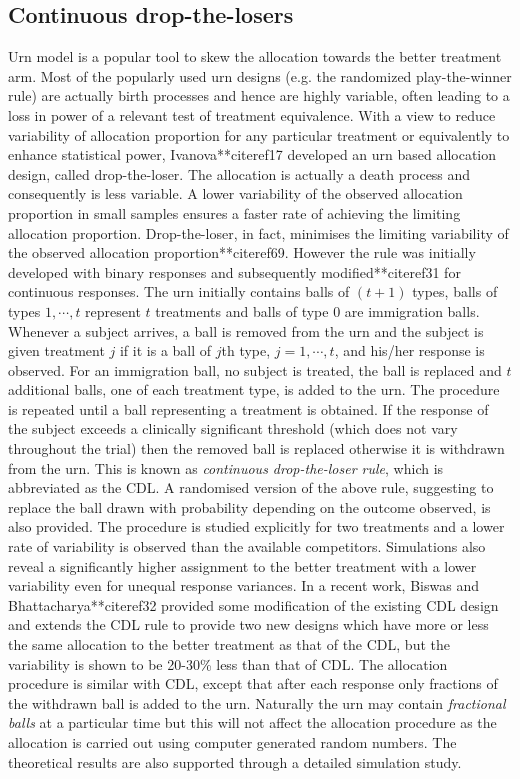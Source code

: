 \subsection{Continuous drop-the-losers}

Urn model is a popular tool to skew the allocation towards the better treatment arm. Most of the popularly used urn designs (e.g. the randomized play-the-winner rule) are actually birth processes and hence are highly variable, often leading to a loss in power of a relevant test of treatment equivalence. With a view to reduce variability of allocation proportion for any particular treatment or equivalently to enhance statistical power, Ivanova**citeref{17} developed an urn based allocation design, called drop-the-loser. The allocation is actually a death process and consequently is less variable. A lower variability of the observed allocation proportion in small samples ensures a faster rate of achieving the limiting allocation proportion. Drop-the-loser, in fact, minimises the limiting variability of the observed allocation proportion**citeref{69}. However the rule was initially developed
with binary responses and subsequently modified**citeref{31} for
continuous responses. The urn initially contains balls of $(t+1)$ types,
balls of types $1,\cdots ,t$ represent $t$ treatments and balls of type 0 are immigration balls. Whenever a subject arrives, a ball is removed from the urn and the subject is given treatment $j$ if it is a ball of $j$th type, $j=1,\cdots ,t$, and his/her response is observed. For an immigration ball, no subject is treated, the ball is replaced and $t$ additional balls, one of each treatment type, is added to the urn. The procedure is repeated until a ball representing a treatment is obtained. If the response of the subject exceeds a clinically significant threshold (which does not vary throughout the trial) then the removed ball is replaced otherwise it is withdrawn from the urn. This is known as \textit{continuous drop-the-loser rule}, which is abbreviated as the CDL. A randomised version of the above rule, suggesting to replace the ball drawn with probability depending on the outcome observed, is also
provided. The procedure is studied explicitly for two treatments and
a lower rate of variability is observed than the available competitors. Simulations also reveal a significantly higher assignment to the better treatment with a lower variability  even for unequal response variances. In a recent work, Biswas and Bhattacharya**citeref{32} provided some modification of the existing CDL design and extends the CDL rule to provide two new designs which have more or less the same allocation to the better treatment as that of the CDL, but the variability is shown to be 20-30\% less than that of CDL. The allocation procedure is similar with CDL, except that after each response only fractions of the withdrawn ball is added to the urn. Naturally the urn may contain \textit{fractional balls} at a particular time but this will not affect the allocation procedure as the allocation is carried out using computer generated random numbers. The theoretical results are also supported through a detailed simulation study.

